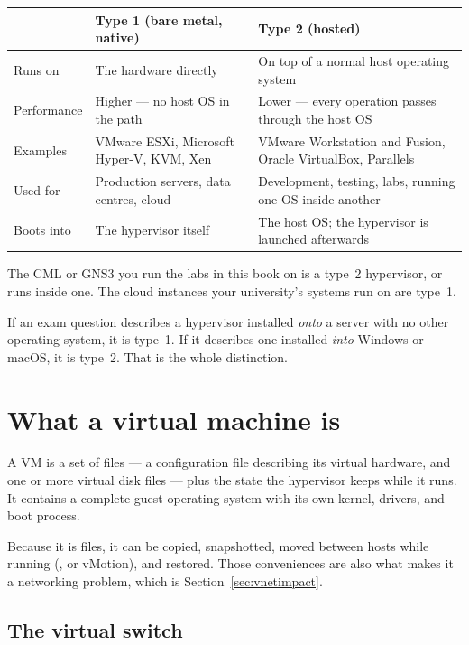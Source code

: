 \begin{longtable}{@{}L{3.0cm}L{5.8cm}L{6.1cm}@{}}
\toprule
{}
\textbf{} & \textbf{Type 1 (bare metal, native)} & \textbf{Type 2 (hosted)} \\
\midrule
\endhead
Runs on & The hardware directly &
On top of a normal host operating system \\
Performance & Higher --- no host OS in the path &
Lower --- every operation passes through the host OS \\
Examples & VMware ESXi, Microsoft Hyper-V, KVM, Xen &
VMware Workstation and Fusion, Oracle VirtualBox, Parallels \\
Used for & Production servers, data centres, cloud &
Development, testing, labs, running one OS inside another \\
Boots into & The hypervisor itself &
The host OS; the hypervisor is launched afterwards \\
\bottomrule
\end{longtable}

\begin{conceptbox}
The CML or GNS3 you run the labs in this book on is a type~2 hypervisor, or runs
inside one. The cloud instances your university's systems run on are type~1.

If an exam question describes a hypervisor installed \emph{onto} a server with no
other operating system, it is type~1. If it describes one installed \emph{into}
Windows or macOS, it is type~2. That is the whole distinction.
\end{conceptbox}

\section{What a virtual machine is}

A VM is a set of files --- a configuration file describing its virtual hardware,
and one or more virtual disk files --- plus the state the hypervisor keeps while
it runs. It contains a complete guest operating system with its own kernel,
drivers, and boot process.

Because it is files, it can be copied, snapshotted, moved between hosts while
running (, or vMotion), and restored. Those conveniences are
also what makes it a networking problem, which is Section~\ref{sec:vnetimpact}.

\subsection{The virtual switch}

